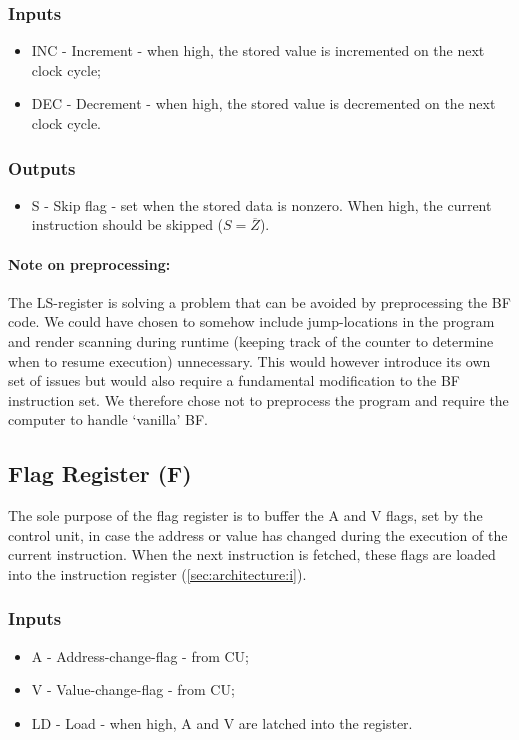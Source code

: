 \subsubsection*{Inputs}
\begin{itemize}
\item INC - Increment - when high, the stored value is incremented on the next clock cycle;
\item DEC - Decrement - when high, the stored value is decremented on the next clock cycle.
\end{itemize}

\subsubsection*{Outputs}
\begin{itemize}
\item S - Skip flag - set when the stored data is nonzero. When high, the current instruction should be skipped ($S = \overline{Z}$).
\end{itemize}

\paragraph{Note on preprocessing:} The LS-register is solving a problem that can be avoided by preprocessing the BF code. We could have chosen to somehow include jump-locations in the program and render scanning during runtime (keeping track of the counter to determine when to resume execution) unnecessary. This would however introduce its own set of issues but would also require a fundamental modification to the BF instruction set. We therefore chose not to preprocess the program and require the computer to handle `vanilla' BF.

\subsection{Flag Register (F)} \label{sec:architecture:f}
The sole purpose of the flag register is to buffer the A and V flags, set by the control unit, in case the address or value has changed during the execution of the current instruction. When the next instruction is fetched, these flags are loaded into the instruction register (\ref{sec:architecture:i}). 

\subsubsection*{Inputs}
\begin{itemize}
\item A - Address-change-flag - from CU;
\item V - Value-change-flag - from CU;
\item LD - Load - when high, A and V are latched into the register.
\end{itemize}

